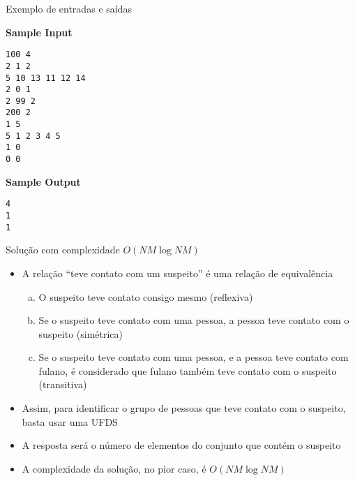 \begin{frame}[fragile]{Exemplo de entradas e saídas}

\begin{footnotesize}
\begin{minipage}[t]{0.6\textwidth}
\textbf{Sample Input}
\begin{verbatim}
100 4
2 1 2
5 10 13 11 12 14
2 0 1
2 99 2
200 2
1 5
5 1 2 3 4 5
1 0
0 0
\end{verbatim}
\end{minipage}
\begin{minipage}[t]{0.35\textwidth}
\textbf{Sample Output}
\begin{verbatim}
4
1
1
\end{verbatim}
\end{minipage}
\end{footnotesize}

\end{frame}

\begin{frame}[fragile]{Solução com complexidade $O(NM\log NM)$}

    \begin{itemize}
        \item A relação ``teve contato com um suspeito'' é uma relação de equivalência
            \begin{enumerate}[(a)]
                \item O suspeito teve contato consigo mesmo (reflexiva)
                \item Se o suspeito teve contato com uma pessoa, a pessoa teve contato com o 
                    suspeito (simétrica)
                \item Se o suspeito teve contato com uma pessoa, e a pessoa teve contato com 
                    fulano, é considerado que fulano também teve contato com o suspeito (transitiva)
            \end{enumerate}

        \item Assim, para identificar o grupo de pessoas que teve contato com o suspeito,
            basta usar uma UFDS

        \item A resposta será o número de elementos do conjunto que contém o suspeito

        \item A complexidade da solução, no pior caso, é $O(NM\log NM)$

   \end{itemize}

\end{frame}

